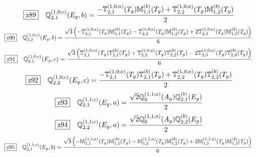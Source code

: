 \documentclass[fleqn,10pt,landscape]{jsarticle}
\begin{document}
\begin{dmath*}
\hspace*{3mm}\fbox{z89}\quad \mathbb{Q}_{2,1}^{(1,0;c)}(E_{g},b)=\frac{- \mathbb{T}_{2,1}^{(1,0;a)}(T_{g}) \mathbb{M}_{1,1}^{(b)}(T_{g}) + \mathbb{T}_{2,2}^{(1,0;a)}(T_{g}) \mathbb{M}_{1,2}^{(b)}(T_{g})}{2}
\end{dmath*}
\begin{dmath*}
\hspace*{3mm}\fbox{z90}\quad \mathbb{Q}_{2,2}^{(1,0;c)}(E_{g},b)=\frac{\sqrt{3} \left(- \mathbb{T}_{2,1}^{(1,0;a)}(T_{g}) \mathbb{M}_{1,1}^{(b)}(T_{g}) - \mathbb{T}_{2,2}^{(1,0;a)}(T_{g}) \mathbb{M}_{1,2}^{(b)}(T_{g}) + 2 \mathbb{T}_{2,3}^{(1,0;a)}(T_{g}) \mathbb{M}_{1,3}^{(b)}(T_{g})\right)}{6}
\end{dmath*}
\begin{dmath*}
\hspace*{3mm}\fbox{z91}\quad \mathbb{Q}_{2,1}^{(1,0;c)}(E_{g},c)=\frac{\sqrt{3} \left(\mathbb{T}_{2,1}^{(1,0;a)}(T_{g}) \mathbb{T}_{2,1}^{(b)}(T_{g}) + \mathbb{T}_{2,2}^{(1,0;a)}(T_{g}) \mathbb{T}_{2,2}^{(b)}(T_{g}) - 2 \mathbb{T}_{2,3}^{(1,0;a)}(T_{g}) \mathbb{T}_{2,3}^{(b)}(T_{g})\right)}{6}
\end{dmath*}
\begin{dmath*}
\hspace*{3mm}\fbox{z92}\quad \mathbb{Q}_{2,2}^{(1,0;c)}(E_{g},c)=\frac{- \mathbb{T}_{2,1}^{(1,0;a)}(T_{g}) \mathbb{T}_{2,1}^{(b)}(T_{g}) + \mathbb{T}_{2,2}^{(1,0;a)}(T_{g}) \mathbb{T}_{2,2}^{(b)}(T_{g})}{2}
\end{dmath*}
\begin{dmath*}
\hspace*{3mm}\fbox{z93}\quad \mathbb{Q}_{2,1}^{(1,1;c)}(E_{g},a)=\frac{\sqrt{2} \mathbb{Q}_{0}^{(1,1;a)}(A_{g}) \mathbb{Q}_{2,1}^{(b)}(E_{g})}{2}
\end{dmath*}
\begin{dmath*}
\hspace*{3mm}\fbox{z94}\quad \mathbb{Q}_{2,2}^{(1,1;c)}(E_{g},a)=\frac{\sqrt{2} \mathbb{Q}_{0}^{(1,1;a)}(A_{g}) \mathbb{Q}_{2,2}^{(b)}(E_{g})}{2}
\end{dmath*}
\begin{dmath*}
\hspace*{3mm}\fbox{z95}\quad \mathbb{Q}_{2,1}^{(1,1;c)}(E_{g},b)=\frac{\sqrt{3} \left(- \mathbb{M}_{1,1}^{(1,1;a)}(T_{g}) \mathbb{M}_{1,1}^{(b)}(T_{g}) - \mathbb{M}_{1,2}^{(1,1;a)}(T_{g}) \mathbb{M}_{1,2}^{(b)}(T_{g}) + 2 \mathbb{M}_{1,3}^{(1,1;a)}(T_{g}) \mathbb{M}_{1,3}^{(b)}(T_{g})\right)}{6}
\end{dmath*}
\end{document}
